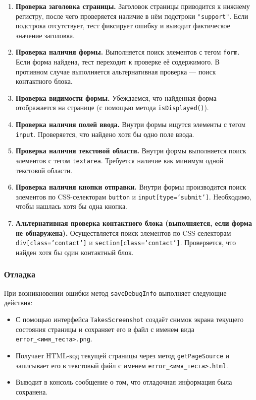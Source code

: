 \documentclass{article}[14pt]
\begin{document}
\begin{enumerate}
\item \textbf{Проверка заголовка страницы.} Заголовок страницы приводится к нижнему регистру, после чего проверяется наличие в нём подстроки \texttt{"support"}. Если подстрока отсутствует, тест фиксирует ошибку и выводит фактическое значение заголовка.

\item \textbf{Проверка наличия формы.} Выполняется поиск элементов с тегом \texttt{form}. Если форма найдена, тест переходит к проверке её содержимого. В противном случае выполняется альтернативная проверка — поиск контактного блока.

\item \textbf{Проверка видимости формы.} Убеждаемся, что найденная форма отображается на странице (с помощью метода \texttt{isDisplayed()}).

\item \textbf{Проверка наличия полей ввода.} Внутри формы ищутся элементы с тегом \texttt{input}. Проверяется, что найдено хотя бы одно поле ввода.

\item \textbf{Проверка наличия текстовой области.} Внутри формы выполняется поиск элементов с тегом \texttt{textarea}. Требуется наличие как минимум одной текстовой области.

\item \textbf{Проверка наличия кнопки отправки.} Внутри формы производится поиск элементов по CSS-селекторам \texttt{button} и \texttt{input[type='submit']}. Необходимо, чтобы нашлась хотя бы одна кнопка.

\item \textbf{Альтернативная проверка контактного блока (выполняется, если форма не обнаружена).} Осуществляется поиск элементов по CSS-селекторам \texttt{div[class='contact']} и \texttt{section[class='contact']}. Проверяется, что найден хотя бы один контактный блок.
\end{enumerate}

\subsubsection{Отладка}

При возникновении ошибки метод \texttt{saveDebugInfo} выполняет следующие действия:

\begin{itemize}
\item С помощью интерфейса \texttt{TakesScreenshot} создаёт снимок экрана текущего состояния страницы и сохраняет его в файл с именем вида \texttt{error\_<имя\_теста>.png}.
\item Получает HTML-код текущей страницы через метод \texttt{getPageSource} и записывает его в текстовый файл с именем \texttt{error\_<имя\_теста>.html}.
\item Выводит в консоль сообщение о том, что отладочная информация была сохранена.
\end{itemize}
\end{document}
